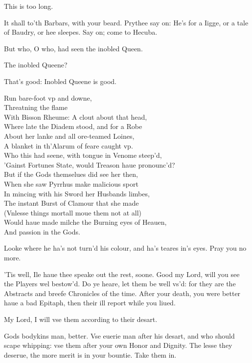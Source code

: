 \documentclass[a5paper,DIV=calc,11pt]{scrbook}
\begin{document}
\begin{drama*}
    \polspeaks This is too long.
    
    \hamspeaks It shall to'th Barbars, with your beard. Prythee say on: He's for a Iigge, or a tale of Baudry, or hee sleepes. Say on; come to Hecuba.
    
     But who, O who, had seen the inobled Queen.
    
    \hamspeaks The inobled Queene?
    
    \polspeaks That's good: Inobled Queene is good.
    
     Run bare-foot vp and downe,\\
    Threatning the flame\\
    With Bisson Rheume: A clout about that head,\\
    Where late the Diadem stood, and for a Robe\\
    About her lanke and all ore-teamed Loines,\\
    A blanket in th'Alarum of feare caught vp.\\
    Who this had seene, with tongue in Venome steep'd,\\
    'Gainst Fortunes State, would Treason haue pronounc'd?\\
    But if the Gods themselues did see her then,\\
    When she saw Pyrrhus make malicious sport\\
    In mincing with his Sword her Husbands limbes,\\
    The instant Burst of Clamour that she made\\
    (Vnlesse things mortall moue them not at all)\\
    Would haue made milche the Burning eyes of Heauen,\\
    And passion in the Gods.
    
    \polspeaks Looke where he ha's not turn'd his colour, and ha's teares in's eyes. Pray you no more.
    
    \hamspeaks 'Tis well, Ile haue thee speake out the rest, soone. Good my Lord, will you see the Players wel bestow'd. Do ye heare, let them be well vs'd: for they are the Abstracts and breefe Chronicles of the time. After your death, you were better haue a bad Epitaph, then their ill report while you liued.
    
    \polspeaks My Lord, I will vse them according to their desart.
    
    \hamspeaks Gods bodykins man, better. Vse euerie man after his desart, and who should scape whipping: vse them after your own Honor and Dignity. The lesse they deserue, the more merit is in your bountie. Take them in.
    

\end{drama*}
\end{document}
